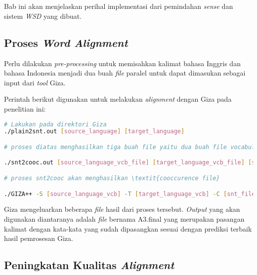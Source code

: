 \chapter{\babEmpat} \label{implementasi}
Bab ini akan menjelaskan perihal implementasi dari pemindahan \textit{sense} dan sistem \textit{WSD} yang dibuat.

\section{Proses \textit{Word Alignment}}
Perlu dilakukan \textit{pre-processing} untuk memisahkan kalimat bahasa Inggris dan bahasa Indonesia menjadi dua buah \textit{file} paralel untuk dapat dimasukan sebagai input dari \textit{tool} Giza.

Perintah berikut digunakan untuk melakukan \textit{alignment} dengan Giza pada penelitian ini:

\begin{lstlisting}[language=bash,caption={Word Alignment}, label={word-alignment}]
# Lakukan pada direktori Giza
./plain2snt.out [source_language] [target_language]

# proses diatas menghasilkan tiga buah file yaitu dua buah file vocabulary yang berisi indeks dengan kata (bahasa asal, dan bahasa tujuan), dan satu buah file snt yang berisi \textit{alignment} dari kalimat.

./snt2cooc.out [source_language_vcb_file] [target_language_vcb_file] [snt_file] > [coocurrence_file]

# proses snt2cooc akan menghasilkan \textit{cooccurence file}

./GIZA++ -S [source_language_vcb] -T [target_language_vcb] -C [snt_file] -CoocurrenceFile [cooc_file]
\end{lstlisting}

Giza mengeluarkan beberapa \textit{file} hasil dari proses tersebut. \textit{Output} yang akan digunakan diantaranya adalah \textit{file} bernama A3.final yang merupakan pasangan kalimat dengan kata-kata yang sudah dipasangkan sesuai dengan prediksi terbaik hasil pemrosesan Giza.

\section{Peningkatan Kualitas \textit{Alignment}}

